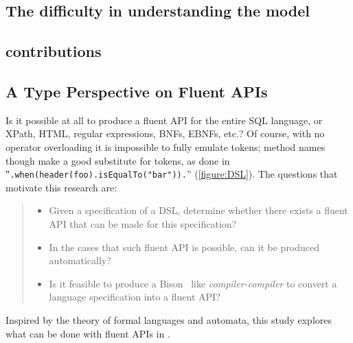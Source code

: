 \subsection{The difficulty in understanding the \Java model}

\subsection{contributions}

\subsection{A Type Perspective on Fluent APIs}
Is it possible at all to produce a fluent API for the entire SQL language, or
XPath, HTML, regular expressions, BNFs, EBNFs, etc.?  Of course, with no
operator overloading it is impossible to fully emulate tokens; method names
though make a good substitute for tokens, as done in
‟\lstinline{.when(header(foo).isEqualTo("bar")).}” (\cref{figure:DSL}).  The
questions that motivate this research are:

\begin{quote}
  \begin{itemize}
    \item Given a specification of a DSL, determine whether there exists
        a fluent API that can be made for this specification?
    \item In the cases that such fluent API is possible,
      can it be produced automatically?
    \item Is it feasible to produce a Bison~\cite{Bison:manual}
        like \emph{compiler-compiler}
        to convert a language specification into a fluent API?
  \end{itemize}
\end{quote}

Inspired by the theory of formal languages and automata,
  this study explores what can be done with fluent APIs in \Java.

